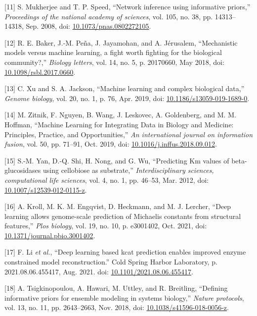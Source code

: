 \documentclass[11pt]{article}
\begin{document}
\hypertarget{citeproc_bib_item_11}{[11] S. Mukherjee and T. P. Speed, “Network inference using informative priors,” \textit{Proceedings of the national academy of sciences}, vol. 105, no. 38, pp. 14313–14318, Sep. 2008, doi: \href{https://doi.org/10.1073/pnas.0802272105}{10.1073/pnas.0802272105}.}

\hypertarget{citeproc_bib_item_12}{[12] R. E. Baker, J.-M. Peña, J. Jayamohan, and A. Jérusalem, “Mechanistic models versus machine learning, a fight worth fighting for the biological community?,” \textit{Biology letters}, vol. 14, no. 5, p. 20170660, May 2018, doi: \href{https://doi.org/10.1098/rsbl.2017.0660}{10.1098/rsbl.2017.0660}.}

\hypertarget{citeproc_bib_item_13}{[13] C. Xu and S. A. Jackson, “Machine learning and complex biological data,” \textit{Genome biology}, vol. 20, no. 1, p. 76, Apr. 2019, doi: \href{https://doi.org/10.1186/s13059-019-1689-0}{10.1186/s13059-019-1689-0}.}

\hypertarget{citeproc_bib_item_14}{[14] M. Zitnik, F. Nguyen, B. Wang, J. Leskovec, A. Goldenberg, and M. M. Hoffman, “Machine Learning for Integrating Data in Biology and Medicine: Principles, Practice, and Opportunities,” \textit{An international journal on information fusion}, vol. 50, pp. 71–91, Oct. 2019, doi: \href{https://doi.org/10.1016/j.inffus.2018.09.012}{10.1016/j.inffus.2018.09.012}.}

\hypertarget{citeproc_bib_item_15}{[15] S.-M. Yan, D.-Q. Shi, H. Nong, and G. Wu, “Predicting Km values of beta-glucosidases using cellobiose as substrate,” \textit{Interdisciplinary sciences, computational life sciences}, vol. 4, no. 1, pp. 46–53, Mar. 2012, doi: \href{https://doi.org/10.1007/s12539-012-0115-z}{10.1007/s12539-012-0115-z}.}

\hypertarget{citeproc_bib_item_16}{[16] A. Kroll, M. K. M. Engqvist, D. Heckmann, and M. J. Lercher, “Deep learning allows genome-scale prediction of Michaelis constants from structural features,” \textit{Plos biology}, vol. 19, no. 10, p. e3001402, Oct. 2021, doi: \href{https://doi.org/10.1371/journal.pbio.3001402}{10.1371/journal.pbio.3001402}.}

\hypertarget{citeproc_bib_item_17}{[17] F. Li \textit{et al.}, “Deep learning based kcat prediction enables improved enzyme constrained model reconstruction.” Cold Spring Harbor Laboratory, p. 2021.08.06.455417, Aug. 2021. doi: \href{https://doi.org/10.1101/2021.08.06.455417}{10.1101/2021.08.06.455417}.}

\hypertarget{citeproc_bib_item_18}{[18] A. Tsigkinopoulou, A. Hawari, M. Uttley, and R. Breitling, “Defining informative priors for ensemble modeling in systems biology,” \textit{Nature protocols}, vol. 13, no. 11, pp. 2643–2663, Nov. 2018, doi: \href{https://doi.org/10.1038/s41596-018-0056-z}{10.1038/s41596-018-0056-z}.}
\end{document}
